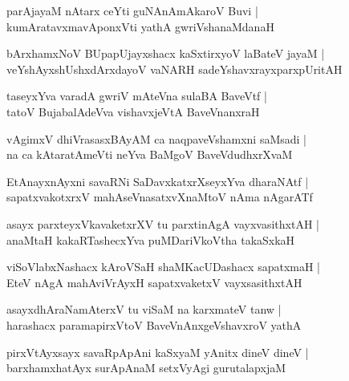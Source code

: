 \documentclass[twoside,12pt,openright]{book}
\newcounter{shloka}[chapter]
\begin{document}
\begin{shloka}%
parAjayaM nAtarx ceYti guNAnAmAkaroV Buvi |\\
kumAratavxmavAponxVti yathA gwriVshanaMdanaH
\end{shloka}

\begin{shloka}%
bArxhamxNoV BUpapUjayxshacx kaSxtirxyoV laBateV jayaM |\\
veYshAyxshUshxdArxdayoV vaNARH sadeYshavxrayxparxpUritAH 
\end{shloka}

\begin{shloka}%
taseyxYva varadA gwriV mAteVna sulaBA BaveVtf |\\
tatoV BujabalAdeVva vishavxjeVtA BaveVnanxraH 
\end{shloka}

\begin{shloka}%
vAgimxV dhiVrasasxBAyAM ca naqpaveVshamxni saMsadi |\\
na ca kAtaratAmeVti neYva BaMgoV BaveVdudhxrXvaM 
\end{shloka}

\begin{shloka}%
EtAnayxnAyxni savaRNi SaDavxkatxrXseyxYva dharaNAtf |\\
sapatxvakotxrxV mahAseVnasatxvXnaMtoV nAma nAgarATf
\end{shloka}

\begin{shloka}%
asayx parxteyxVkavaketxrXV tu parxtinAgA vayxvasithxtAH |\\
anaMtaH kakaRTashecxYva puMDariVkoVtha takaSxkaH 
\end{shloka}

\begin{shloka}%
viSoVlabxNashacx kAroVSaH shaMKacUDashacx sapatxmaH |\\
EteV nAgA mahAviVrAyxH sapatxvaketxV vayxsasithxtAH 
\end{shloka}

\begin{shloka}%
asayxdhAraNamAterxV tu viSaM na karxmateV tanw |\\
harashacx paramapirxVtoV BaveVnAnxgeVshavxroV yathA 
\end{shloka}

\begin{shloka}%
pirxVtAyxsayx savaRpApAni kaSxyaM yAnitx dineV dineV |\\
barxhamxhatAyx surApAnaM setxVyAgi gurutalapxjaM 
\end{shloka}
\end{document}

